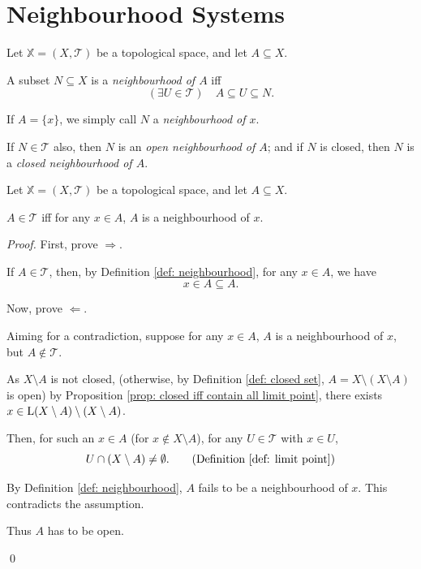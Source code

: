 \section{Neighbourhood Systems}


\begin{definition}
	\label{def: neighbourhood}
	Let $\mathbb X = (X, \mathcal T)$ be a topological space, and let $A \subseteq X$.
	
	A subset $N \subseteq X$ is a \textit{neighbourhood of $A$} iff
	$$
	(\exists U \in \mathcal T) \quad A \subseteq U \subseteq N.
	$$
	
	If $A = \{x\}$, we simply call $N$ a \textit{neighbourhood of $x$}.
	
	If $N \in \mathcal T$ also, then $N$ is an \textit{open neighbourhood of $A$}; and if $N$ is closed, then $N$ is a \textit{closed neighbourhood of $A$}.
\end{definition}


\begin{proposition}
	Let $\mathbb X = (X, \mathcal T)$ be a topological space, and let $A \subseteq X$.
	
	$A \in \mathcal T$ iff for any $x \in A$, $A$ is a neighbourhood of $x$.
	
	\begin{proof}
		First, prove $\Rightarrow$.
		
		If $A \in \mathcal T$, then, by Definition \ref{def: neighbourhood}, for any $x \in A$, we have
		$$
		x \in A \subseteq A.
		$$
		
		\qedlm
		
		Now, prove $\Leftarrow$.
		
		Aiming for a contradiction, suppose for any $x \in A$, $A$ is a neighbourhood of $x$, but $A\notin \mathcal T$.
		
		As $X \setminus A$ is not closed, (otherwise, by Definition \ref{def: closed set}, $A = X \setminus (X \setminus A)$ is open) by Proposition \ref{prop: closed iff contain all limit point}, there exists $x \in \mathrm{L}(X \setminus A) \setminus (X \setminus A)$.
		
		Then, for such an $x \in A$ (for $x \notin X \setminus A$), for any $U \in \mathcal T$ with $x \in U$,
		$$
		U \cap (X \setminus A) \ne \emptyset. \qquad \text{(Definition \ref{def: limit point})}
		$$
		
		By Definition \ref{def: neighbourhood}, $A$ fails to be a neighbourhood of $x$. This contradicts the assumption.
		
		Thus $A$ has to be open.
		
		\qed
	\end{proof}
\end{proposition}


